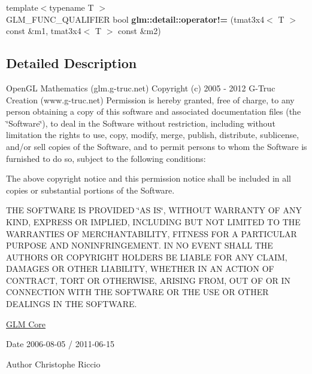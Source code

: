 \begin{DoxyCompactItemize}
\item 
\hypertarget{namespaceglm_1_1detail_a06bb5a617c042f5240f6100cedb38cdb}{{\footnotesize template$<$typename T $>$ }\\G\-L\-M\-\_\-\-F\-U\-N\-C\-\_\-\-Q\-U\-A\-L\-I\-F\-I\-E\-R bool {\bfseries glm\-::detail\-::operator!=} (tmat3x4$<$ T $>$ const \&m1, tmat3x4$<$ T $>$ const \&m2)}\label{namespaceglm_1_1detail_a06bb5a617c042f5240f6100cedb38cdb}

\end{DoxyCompactItemize}


\subsection{Detailed Description}
Open\-G\-L Mathematics (glm.\-g-\/truc.\-net) Copyright (c) 2005 -\/ 2012 G-\/\-Truc Creation (www.\-g-\/truc.\-net) Permission is hereby granted, free of charge, to any person obtaining a copy of this software and associated documentation files (the \char`\"{}\-Software\char`\"{}), to deal in the Software without restriction, including without limitation the rights to use, copy, modify, merge, publish, distribute, sublicense, and/or sell copies of the Software, and to permit persons to whom the Software is furnished to do so, subject to the following conditions\-:

The above copyright notice and this permission notice shall be included in all copies or substantial portions of the Software.

T\-H\-E S\-O\-F\-T\-W\-A\-R\-E I\-S P\-R\-O\-V\-I\-D\-E\-D \char`\"{}\-A\-S I\-S\char`\"{}, W\-I\-T\-H\-O\-U\-T W\-A\-R\-R\-A\-N\-T\-Y O\-F A\-N\-Y K\-I\-N\-D, E\-X\-P\-R\-E\-S\-S O\-R I\-M\-P\-L\-I\-E\-D, I\-N\-C\-L\-U\-D\-I\-N\-G B\-U\-T N\-O\-T L\-I\-M\-I\-T\-E\-D T\-O T\-H\-E W\-A\-R\-R\-A\-N\-T\-I\-E\-S O\-F M\-E\-R\-C\-H\-A\-N\-T\-A\-B\-I\-L\-I\-T\-Y, F\-I\-T\-N\-E\-S\-S F\-O\-R A P\-A\-R\-T\-I\-C\-U\-L\-A\-R P\-U\-R\-P\-O\-S\-E A\-N\-D N\-O\-N\-I\-N\-F\-R\-I\-N\-G\-E\-M\-E\-N\-T. I\-N N\-O E\-V\-E\-N\-T S\-H\-A\-L\-L T\-H\-E A\-U\-T\-H\-O\-R\-S O\-R C\-O\-P\-Y\-R\-I\-G\-H\-T H\-O\-L\-D\-E\-R\-S B\-E L\-I\-A\-B\-L\-E F\-O\-R A\-N\-Y C\-L\-A\-I\-M, D\-A\-M\-A\-G\-E\-S O\-R O\-T\-H\-E\-R L\-I\-A\-B\-I\-L\-I\-T\-Y, W\-H\-E\-T\-H\-E\-R I\-N A\-N A\-C\-T\-I\-O\-N O\-F C\-O\-N\-T\-R\-A\-C\-T, T\-O\-R\-T O\-R O\-T\-H\-E\-R\-W\-I\-S\-E, A\-R\-I\-S\-I\-N\-G F\-R\-O\-M, O\-U\-T O\-F O\-R I\-N C\-O\-N\-N\-E\-C\-T\-I\-O\-N W\-I\-T\-H T\-H\-E S\-O\-F\-T\-W\-A\-R\-E O\-R T\-H\-E U\-S\-E O\-R O\-T\-H\-E\-R D\-E\-A\-L\-I\-N\-G\-S I\-N T\-H\-E S\-O\-F\-T\-W\-A\-R\-E.

\hyperlink{group__core}{G\-L\-M Core}

\begin{DoxyDate}{Date}
2006-\/08-\/05 / 2011-\/06-\/15 
\end{DoxyDate}
\begin{DoxyAuthor}{Author}
Christophe Riccio 
\end{DoxyAuthor}

